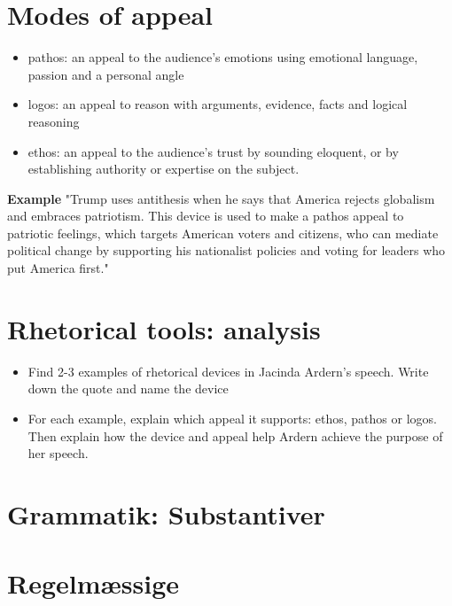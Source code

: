 \documentclass[11pt,a4paper,oneside]{book}
\begin{document}
\section*{Modes of appeal}

\begin{itemize}
\item pathos: an appeal to the audience’s emotions using emotional language, passion and a personal angle
\item logos: an appeal to reason with arguments, evidence, facts and logical reasoning
\item ethos: an appeal to the audience’s trust by sounding eloquent, or by establishing authority or expertise on the subject.
\end{itemize}
\textbf{Example} "Trump uses antithesis when he says that America rejects globalism and embraces patriotism. This device is used to make a pathos appeal to patriotic feelings, which targets American voters and citizens, who can mediate political change by supporting his nationalist policies and voting for leaders who put America first."


\section*{Rhetorical tools: analysis}

\begin{itemize}
\item Find 2-3 examples of rhetorical devices in Jacinda Ardern's speech. Write down the quote and name the device
\item For each example, explain which appeal it supports: ethos, pathos or logos. Then explain how the device and appeal help Ardern achieve the purpose of her speech.
\end{itemize}

\section*{Grammatik: Substantiver}

\section*{Regelmæssige}
\end{document}
